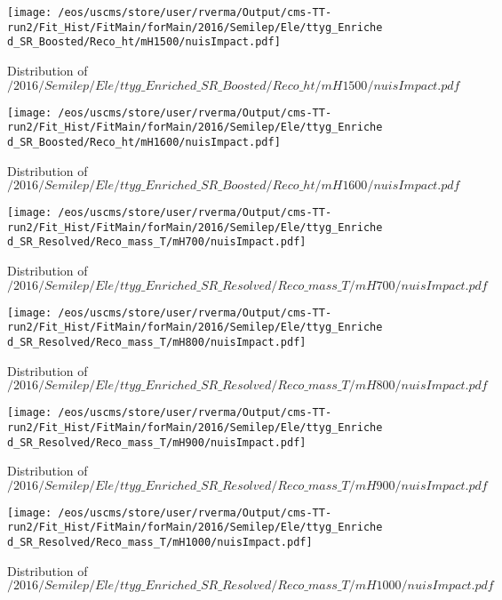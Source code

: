 \begin{figure}
\centering
\texttt{[image: /eos/uscms/store/user/rverma/Output/cms-TT-run2/Fit\_Hist/FitMain/forMain/2016/Semilep/Ele/ttyg\_Enriched\_SR\_Boosted/Reco\_ht/mH1500/nuisImpact.pdf]}
\caption{Distribution of $/2016/Semilep/Ele/ttyg\_Enriched\_SR\_Boosted/Reco\_ht/mH1500/nuisImpact.pdf$}
\end{figure}

\begin{figure}
\centering
\texttt{[image: /eos/uscms/store/user/rverma/Output/cms-TT-run2/Fit\_Hist/FitMain/forMain/2016/Semilep/Ele/ttyg\_Enriched\_SR\_Boosted/Reco\_ht/mH1600/nuisImpact.pdf]}
\caption{Distribution of $/2016/Semilep/Ele/ttyg\_Enriched\_SR\_Boosted/Reco\_ht/mH1600/nuisImpact.pdf$}
\end{figure}

\begin{figure}
\centering
\texttt{[image: /eos/uscms/store/user/rverma/Output/cms-TT-run2/Fit\_Hist/FitMain/forMain/2016/Semilep/Ele/ttyg\_Enriched\_SR\_Resolved/Reco\_mass\_T/mH700/nuisImpact.pdf]}
\caption{Distribution of $/2016/Semilep/Ele/ttyg\_Enriched\_SR\_Resolved/Reco\_mass\_T/mH700/nuisImpact.pdf$}
\end{figure}

\begin{figure}
\centering
\texttt{[image: /eos/uscms/store/user/rverma/Output/cms-TT-run2/Fit\_Hist/FitMain/forMain/2016/Semilep/Ele/ttyg\_Enriched\_SR\_Resolved/Reco\_mass\_T/mH800/nuisImpact.pdf]}
\caption{Distribution of $/2016/Semilep/Ele/ttyg\_Enriched\_SR\_Resolved/Reco\_mass\_T/mH800/nuisImpact.pdf$}
\end{figure}

\begin{figure}
\centering
\texttt{[image: /eos/uscms/store/user/rverma/Output/cms-TT-run2/Fit\_Hist/FitMain/forMain/2016/Semilep/Ele/ttyg\_Enriched\_SR\_Resolved/Reco\_mass\_T/mH900/nuisImpact.pdf]}
\caption{Distribution of $/2016/Semilep/Ele/ttyg\_Enriched\_SR\_Resolved/Reco\_mass\_T/mH900/nuisImpact.pdf$}
\end{figure}

\begin{figure}
\centering
\texttt{[image: /eos/uscms/store/user/rverma/Output/cms-TT-run2/Fit\_Hist/FitMain/forMain/2016/Semilep/Ele/ttyg\_Enriched\_SR\_Resolved/Reco\_mass\_T/mH1000/nuisImpact.pdf]}
\caption{Distribution of $/2016/Semilep/Ele/ttyg\_Enriched\_SR\_Resolved/Reco\_mass\_T/mH1000/nuisImpact.pdf$}
\end{figure}

